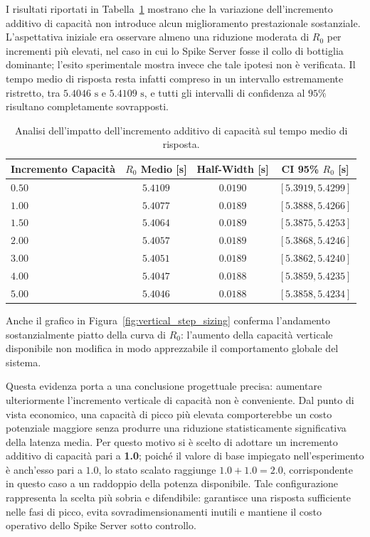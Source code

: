 ﻿\documentclass[a4paper,12pt]{article}
\begin{document}
I risultati riportati in Tabella~\ref{tab:vertical_step_sizing_results} mostrano che la variazione dell'incremento additivo di capacità non introduce alcun miglioramento prestazionale sostanziale. L'aspettativa iniziale era osservare almeno una riduzione moderata di $R_0$ per incrementi più elevati, nel caso in cui lo Spike Server fosse il collo di bottiglia dominante; l'esito sperimentale mostra invece che tale ipotesi non è verificata. Il tempo medio di risposta resta infatti compreso in un intervallo estremamente ristretto, tra $5.4046\text{ s}$ e $5.4109\text{ s}$, e tutti gli intervalli di confidenza al $95\%$ risultano completamente sovrapposti.

\begin{table}[H]
    \centering
    \small
    \renewcommand{\arraystretch}{1.3}
    \begin{tabular}{lccc}
        \hline
        \textbf{Incremento Capacità} & \textbf{$R_0$ Medio [s]} & \textbf{Half-Width [s]} & \textbf{CI 95\% $R_0$ [s]} \\ \hline
        $0.50$ & $5.4109$ & $0.0190$ & $[5.3919, 5.4299]$ \\
        $1.00$ & $5.4077$ & $0.0189$ & $[5.3888, 5.4266]$ \\
        $1.50$ & $5.4064$ & $0.0189$ & $[5.3875, 5.4253]$ \\
        $2.00$ & $5.4057$ & $0.0189$ & $[5.3868, 5.4246]$ \\
        $3.00$ & $5.4051$ & $0.0189$ & $[5.3862, 5.4240]$ \\
        $4.00$ & $5.4047$ & $0.0188$ & $[5.3859, 5.4235]$ \\
        $5.00$ & $5.4046$ & $0.0188$ & $[5.3858, 5.4234]$ \\ \hline
    \end{tabular}
    \caption{Analisi dell'impatto dell'incremento additivo di capacità sul tempo medio di risposta.}
    \label{tab:vertical_step_sizing_results}
\end{table}

Anche il grafico in Figura~\ref{fig:vertical_step_sizing} conferma l'andamento sostanzialmente piatto della curva di $R_0$: l'aumento della capacità verticale disponibile non modifica in modo apprezzabile il comportamento globale del sistema.

Questa evidenza porta a una conclusione progettuale precisa: aumentare ulteriormente l'incremento verticale di capacità non è conveniente. Dal punto di vista economico, una capacità di picco più elevata comporterebbe un costo potenziale maggiore senza produrre una riduzione statisticamente significativa della latenza media. Per questo motivo si è scelto di adottare un incremento additivo di capacità pari a \textbf{1.0}; poiché il valore di base impiegato nell'esperimento è anch'esso pari a $1.0$, lo stato scalato raggiunge $1.0+1.0=2.0$, corrispondente in questo caso a un raddoppio della potenza disponibile. Tale configurazione rappresenta la scelta più sobria e difendibile: garantisce una risposta sufficiente nelle fasi di picco, evita sovradimensionamenti inutili e mantiene il costo operativo dello Spike Server sotto controllo.
\end{document}
